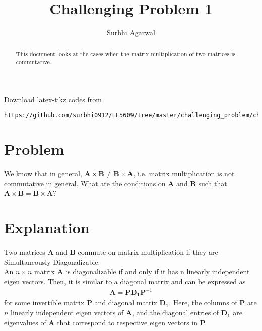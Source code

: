 \documentclass[journal,12pt,twocolumn]{IEEEtran}
\begin{document}
\let\StandardTheFigure\thefigure
\let\vec\mathbf

\renewcommand{\thefigure}{\theproblem}

\def\putbox#1#2#3{\makebox[0in][l]{\makebox[#1][l]{}\raisebox{\baselineskip}[0in][0in]{\raisebox{#2}[0in][0in]{#3}}}}
     \def\rightbox#1{\makebox[0in][r]{#1}}
     \def\centbox#1{\makebox[0in]{#1}}
     \def\topbox#1{\raisebox{-\baselineskip}[0in][0in]{#1}}
     \def\midbox#1{\raisebox{-0.5\baselineskip}[0in][0in]{#1}}
\vspace{3cm}

\title{Challenging Problem 1}
\author{Surbhi Agarwal}

\maketitle

\newpage


\bigskip

\renewcommand{\thefigure}{\theenumi}
\renewcommand{\thetable}{\theenumi}

\begin{abstract}
This document looks at the cases when the matrix multiplication of two matrices is commutative.
\end{abstract}

Download latex-tikz codes from 
%
\begin{lstlisting}
https://github.com/surbhi0912/EE5609/tree/master/challenging_problem/challenging2
\end{lstlisting}
%
\section{Problem}
We know that in general, $\vec{A}\times\vec{B} \ne \vec{B}\times\vec{A}$, i.e. matrix multiplication is not commutative in general. What are the conditions on $\vec{A}$ and $\vec{B}$ such that $\vec{A}\times\vec{B} = \vec{B}\times\vec{A}$?

\section{Explanation}
Two matrices $\vec{A}$ and $\vec{B}$ commute on matrix multiplication if they are Simultaneously Diagonalizable.\\

An $n\times n$ matrix $\vec{A}$ is diagonalizable if and only if it has n linearly independent eigen vectors. Then, it is similar to a diagonal matrix and can be expressed as
\begin{align}\label{eq1}
    \vec{A} = \vec{P}\vec{D_1}\vec{P}^{-1}
\end{align}
for some invertible matrix $\vec{P}$ and diagonal matrix $\vec{D_1}$. Here, the columns of $\vec{P}$ are $n$ linearly independent eigen vectors of $\vec{A}$, and the diagonal entries of $\vec{D_1}$ are eigenvalues of $\vec{A}$ that correspond to respective eigen vectors in $\vec{P}$\\
\end{document}
